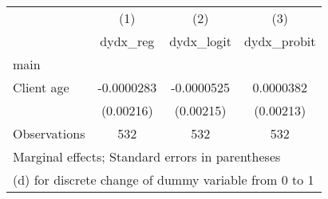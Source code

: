 \begin{tabular}{l*{3}{c}}
\toprule
                    &\multicolumn{1}{c}{(1)}&\multicolumn{1}{c}{(2)}&\multicolumn{1}{c}{(3)}\\
                    &\multicolumn{1}{c}{dydx\_reg}&\multicolumn{1}{c}{dydx\_logit}&\multicolumn{1}{c}{dydx\_probit}\\
\midrule
main                &            &            &            \\
Client age          &  -0.0000283&  -0.0000525&   0.0000382\\
                    &   (0.00216)&   (0.00215)&   (0.00213)\\
\midrule
Observations        &         532&         532&         532\\
\bottomrule
\multicolumn{4}{l}{\footnotesize Marginal effects; Standard errors in parentheses}\\
\multicolumn{4}{l}{\footnotesize  (d) for discrete change of dummy variable from 0 to 1}\\
\end{tabular}
